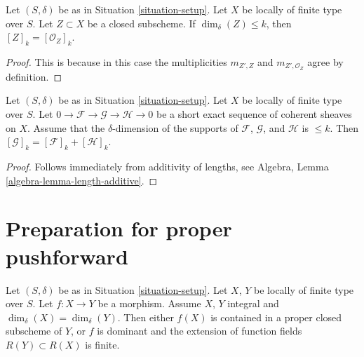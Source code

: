 \begin{lemma}
\label{lemma-cycle-closed-coherent}
Let $(S, \delta)$ be as in Situation \ref{situation-setup}.
Let $X$ be locally of finite type over $S$.
Let $Z \subset X$ be a closed subscheme.
If $\dim_\delta(Z) \leq k$, then $[Z]_k = [{\mathcal O}_Z]_k$.
\end{lemma}

\begin{proof}
This is because in this case the multiplicities $m_{Z', Z}$ and
$m_{Z', \mathcal{O}_Z}$ agree by definition.
\end{proof}

\begin{lemma}
\label{lemma-additivity-sheaf-cycle}
Let $(S, \delta)$ be as in Situation \ref{situation-setup}.
Let $X$ be locally of finite type over $S$.
Let $0 \to \mathcal{F} \to \mathcal{G} \to \mathcal{H} \to 0$
be a short exact sequence of coherent sheaves on $X$.
Assume that the $\delta$-dimension of the supports
of $\mathcal{F}$, $\mathcal{G}$, and $\mathcal{H}$ is $\leq k$.
Then $[\mathcal{G}]_k = [\mathcal{F}]_k + [\mathcal{H}]_k$.
\end{lemma}

\begin{proof}
Follows immediately from additivity of lengths, see
Algebra, Lemma \ref{algebra-lemma-length-additive}.
\end{proof}









\section{Preparation for proper pushforward}
\label{section-preparation-pushforward}

\begin{lemma}
\label{lemma-equal-dimension}
Let $(S, \delta)$ be as in Situation \ref{situation-setup}.
Let $X$, $Y$ be locally of finite type over $S$.
Let $f : X \to Y$ be a morphism.
Assume $X$, $Y$ integral and $\dim_\delta(X) = \dim_\delta(Y)$.
Then either $f(X)$ is contained in a proper closed subscheme
of $Y$, or $f$ is dominant and the extension of function fields
$R(Y) \subset R(X)$ is finite.
\end{lemma}

